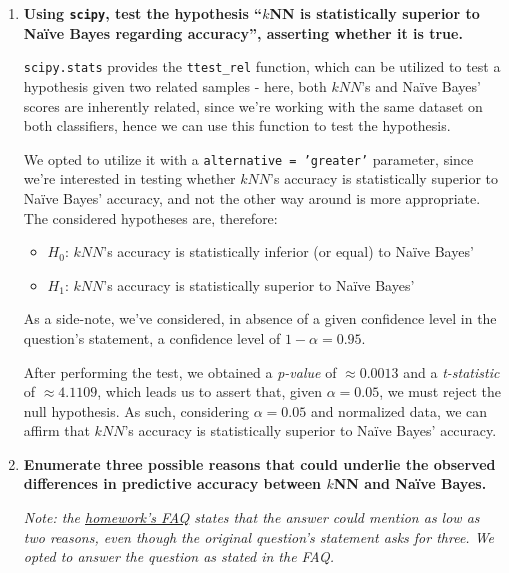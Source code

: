 \documentclass[12pt]{article}
\begin{document}
\begin{enumerate}[leftmargin=\labelsep,resume]
        \pagebreak

  \item \textbf{Using \texttt{scipy}, test the hypothesis “$k$NN is statistically superior to Naïve Bayes regarding
          accuracy”, asserting whether it is true.}

        \texttt{scipy.stats} provides the \texttt{ttest\_rel} function, which can be utilized
        to test a hypothesis given two related samples - here, both $kNN$'s and Naïve Bayes'
        scores are inherently related, since we're working with the same dataset on both
        classifiers, hence we can use this function to test the hypothesis.

        We opted to utilize it with a \texttt{alternative = 'greater'} parameter, since
        we're interested in testing whether $kNN$'s accuracy is statistically superior
        to Naïve Bayes' accuracy, and not the other way around is more appropriate.
        The considered hypotheses are, therefore:

        \begin{itemize}
          \item $H_0$: $kNN$'s accuracy is statistically inferior (or equal) to Naïve Bayes'
          \item $H_1$: $kNN$'s accuracy is statistically superior to Naïve Bayes'
        \end{itemize}

        As a side-note, we've considered, in absence of a given confidence level in the
        question's statement, a confidence level of $1 - \alpha = 0.95$.

        After performing the test, we obtained a \textit{p-value} of $\approx 0.0013$ and
        a \textit{t-statistic} of $\approx 4.1109$, which leads us to assert that, given
        $\alpha = 0.05$, we must reject the null hypothesis.
        As such, considering $\alpha = 0.05$ and normalized data, we can affirm that
        $kNN$'s accuracy is statistically superior to Naïve Bayes' accuracy.

        \pagebreak

  \item \textbf{Enumerate three possible reasons that could underlie the observed differences in predictive
          accuracy between $k$NN and Naïve Bayes.}

        \textit{Note: the \href{https://fenix.tecnico.ulisboa.pt/disciplinas/Apre2/2022-2023/1-semestre/homeworks}{homework's FAQ}
          states that the answer could mention as low as two reasons, even though the original
          question's statement asks for three. We opted to answer the question as stated in
          the FAQ.}


\end{enumerate}
\end{document}
